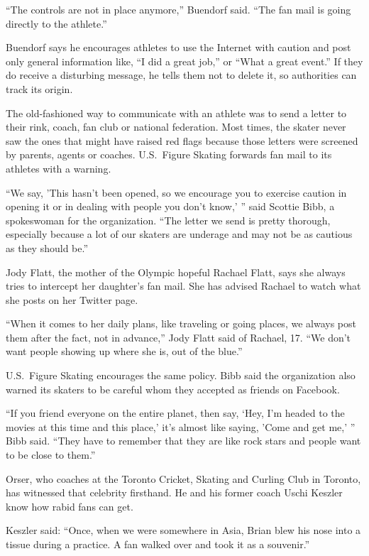 ﻿\documentclass[12pt]{article}
\begin{document}
``The controls are not in place anymore,'' Buendorf said. ``The fan mail is going directly to the
athlete.''

Buendorf says he encourages athletes to use the Internet with caution and post only general
information like, ``I did a great job,'' or ``What a great event.'' If they do receive a disturbing
message, he tells them not to delete it, so authorities can track its origin.

The old-fashioned way to communicate with an athlete was to send a letter to their rink, coach, fan
club or national federation. Most times, the skater never saw the ones that might have raised red
flags because those letters were screened by parents, agents or coaches. U.S.~Figure Skating
forwards fan mail to its athletes with a warning.

``We say, 'This hasn't been opened, so we encourage you to exercise caution in opening it or in
dealing with people you don't know,' '' said Scottie Bibb, a spokeswoman for the organization. ``The
letter we send is pretty thorough, especially because a lot of our skaters are underage and may not
be as cautious as they should be.''

Jody Flatt, the mother of the Olympic hopeful Rachael Flatt, says she always tries to intercept her
daughter's fan mail. She has advised Rachael to watch what she posts on her Twitter page.

``When it comes to her daily plans, like traveling or going places, we always post them after the
fact, not in advance,'' Jody Flatt said of Rachael, 17. ``We don't want people showing up where she
is, out of the blue.''

U.S.~Figure Skating encourages the same policy. Bibb said the organization also warned its skaters
to be careful whom they accepted as friends on Facebook.

``If you friend everyone on the entire planet, then say, `Hey, I'm headed to the movies at this time
and this place,' it's almost like saying, 'Come and get me,' '' Bibb said. ``They have to remember
that they are like rock stars and people want to be close to them.''

Orser, who coaches at the Toronto Cricket, Skating and Curling Club in Toronto, has witnessed that
celebrity firsthand. He and his former coach Uschi Keszler know how rabid fans can get.

Keszler said: ``Once, when we were somewhere in Asia, Brian blew his nose into a tissue during a
practice. A fan walked over and took it as a souvenir.''
\end{document}
